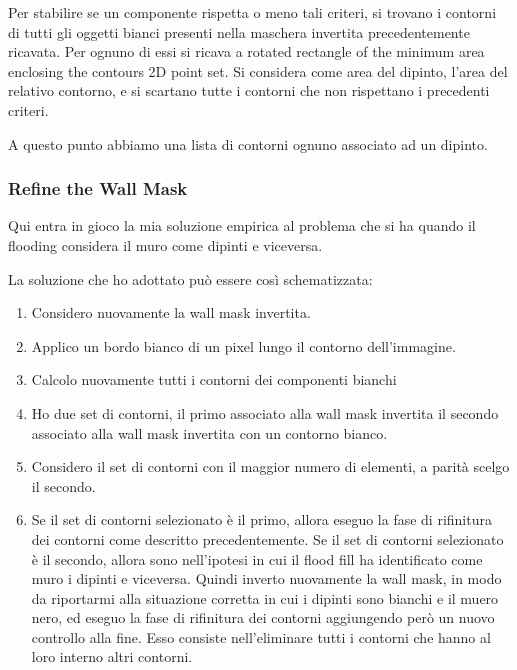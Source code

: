 \documentclass[10pt,twocolumn,letterpaper]{article}
\begin{document}
Per stabilire se un componente rispetta o meno tali criteri, si trovano i contorni di tutti gli oggetti bianci presenti nella maschera invertita precedentemente ricavata. Per ognuno di essi si ricava a rotated rectangle of the minimum area enclosing the contours 2D point set.
Si considera come area del dipinto, l'area del relativo contorno, e si scartano tutte i contorni che non rispettano i precedenti criteri.

A questo punto abbiamo una lista di contorni ognuno associato ad un dipinto.

\subsubsection{Refine the Wall Mask}

Qui entra in gioco la mia soluzione empirica al problema che si ha quando il flooding considera il muro come dipinti e viceversa. 

La soluzione che ho adottato può essere così schematizzata:
\begin{enumerate}
   \item Considero nuovamente la wall mask invertita.
   \item Applico un bordo bianco di un pixel lungo il contorno dell'immagine.
   \item Calcolo nuovamente tutti i contorni dei componenti bianchi
   \item Ho due set di contorni, il primo associato alla wall mask invertita il secondo associato alla wall mask invertita con un contorno bianco.
   \item Considero il set di contorni con il maggior numero di elementi, a parità scelgo il secondo.
   \item Se il set di contorni selezionato è il primo, allora eseguo la fase di rifinitura dei contorni come descritto precedentemente. Se il set di contorni selezionato è il secondo, allora sono nell'ipotesi in cui il flood fill ha identificato come muro i dipinti e viceversa. Quindi inverto nuovamente la wall mask, in modo da riportarmi alla situazione corretta in cui i dipinti sono bianchi e il muero nero, ed eseguo la fase di rifinitura dei contorni aggiungendo però un nuovo controllo alla fine. Esso consiste nell'eliminare tutti i contorni che hanno al loro interno altri contorni.
\end{enumerate}
\end{document}
